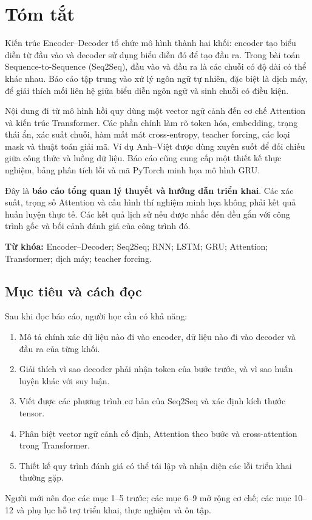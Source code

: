 \documentclass[11pt,a4paper]{article}
\numberwithin{equation}{section}
\begin{document}
\section*{Tóm tắt}
Kiến trúc Encoder--Decoder tổ chức mô hình thành hai khối: encoder tạo biểu diễn từ đầu vào và decoder sử dụng biểu diễn đó để tạo đầu ra. Trong bài toán Sequence-to-Sequence (Seq2Seq), đầu vào và đầu ra là các chuỗi có độ dài có thể khác nhau. Báo cáo tập trung vào xử lý ngôn ngữ tự nhiên, đặc biệt là dịch máy, để giải thích mối liên hệ giữa biểu diễn ngôn ngữ và sinh chuỗi có điều kiện.

Nội dung đi từ mô hình hồi quy dùng một vector ngữ cảnh đến cơ chế Attention và kiến trúc Transformer. Các phần chính làm rõ token hóa, embedding, trạng thái ẩn, xác suất chuỗi, hàm mất mát cross-entropy, teacher forcing, các loại mask và thuật toán giải mã. Ví dụ Anh--Việt được dùng xuyên suốt để đối chiếu giữa công thức và luồng dữ liệu. Báo cáo cũng cung cấp một thiết kế thực nghiệm, bảng phân tích lỗi và mã PyTorch minh họa mô hình GRU.

Đây là \textbf{báo cáo tổng quan lý thuyết và hướng dẫn triển khai}. Các xác suất, trọng số Attention và cấu hình thí nghiệm minh họa không phải kết quả huấn luyện thực tế. Các kết quả lịch sử nếu được nhắc đến đều gắn với công trình gốc và bối cảnh đánh giá của công trình đó.

\textbf{Từ khóa:} Encoder--Decoder; Seq2Seq; RNN; LSTM; GRU; Attention; Transformer; dịch máy; teacher forcing.

\subsection*{Mục tiêu và cách đọc}
Sau khi đọc báo cáo, người học cần có khả năng:
\begin{enumerate}
\item Mô tả chính xác dữ liệu nào đi vào encoder, dữ liệu nào đi vào decoder và đầu ra của từng khối.
\item Giải thích vì sao decoder phải nhận token của bước trước, và vì sao huấn luyện khác với suy luận.
\item Viết được các phương trình cơ bản của Seq2Seq và xác định kích thước tensor.
\item Phân biệt vector ngữ cảnh cố định, Attention theo bước và cross-attention trong Transformer.
\item Thiết kế quy trình đánh giá có thể tái lập và nhận diện các lỗi triển khai thường gặp.
\end{enumerate}
Người mới nên đọc các mục 1--5 trước; các mục 6--9 mở rộng cơ chế; các mục 10--12 và phụ lục hỗ trợ triển khai, thực nghiệm và ôn tập.
\clearpage
\begingroup
{}
\setlength{\parskip}{0pt}
\normalsize
\tableofcontents
\endgroup
\clearpage
{}
\end{document}
